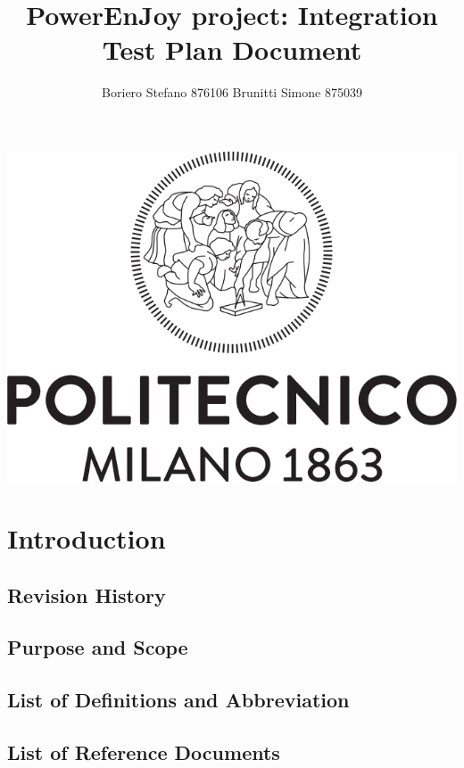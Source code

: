 \documentclass{article}
\begin{document}
 
\title{\textbf{{\Huge PowerEnJoy project: Integration Test Plan Document}}}
\author{\begin{large}
Boriero Stefano  876106  
Brunitti Simone   875039
\end{large} }


\maketitle
\includegraphics[scale=0.5]{Images/Logo_Politecnico_Milano.png}
\newpage
\tableofcontents

\newpage
\section{Introduction}

\subsection{Revision History}
\subsection{Purpose and Scope}



\subsection{List of Definitions and	Abbreviation}


\subsection{List of Reference Documents}

\newpage
\end{document}
